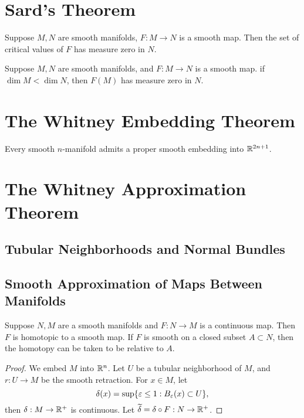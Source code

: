 \section{Sard's Theorem}

\begin{theorem}
    Suppose $M,N$ are smooth manifolds, $F:M \to N$ is a smooth map. Then the set of critical values of $F$ has measure zero in $N$. 
\end{theorem}

\begin{corollary}
    Suppose $M,N$ are smooth manifolds, and $F:M \to N$ is a smooth map. if $\dim M < \dim N$, then $F(M)$ has measure zero in $N$. 
\end{corollary}

\section{The Whitney Embedding Theorem}

\begin{theorem}
    Every smooth $n$-manifold admits a proper smooth embedding into $\mathbb{R}^{2n+1}$.
\end{theorem}
\section{The Whitney Approximation Theorem}

\subsection{Tubular Neighborhoods and Normal Bundles}

\subsection{Smooth Approximation of Maps Between Manifolds}

\begin{theorem}
    Suppose $N, M$ are a smooth manifolds and $F:N \to M$ is a continuous map. Then $F$ is homotopic to a smooth map. If $F$ is smooth on a closed subset $A \subset N$, then the homotopy can be taken to be relative to $A$.    
\end{theorem}
\begin{proof}
    We embed $M$ into $\mathbb{R}^n$. Let $U$ be a tubular neighborhood of $M$, and $r:U \to M$ be the smooth retraction. For  $x \in M$, let 
    $$\delta(x) = \sup\{\varepsilon \leq 1:B_\varepsilon(x) \subset U\}, $$
    then $\delta:M \to \mathbb{R}^+$ is continuous. Let $\widetilde{\delta} = \delta \circ F:N \to \mathbb{R}^+$.
\end{proof}
